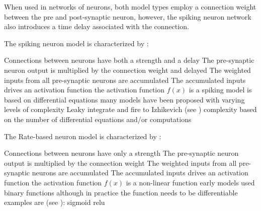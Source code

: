 When used in networks of neurons, both model types employ a connection weight between the pre and post-synaptic neuron, however, the spiking neuron network also introduces a time delay associated with the connection.

The spiking neuron model is characterized by \cite{paugam2012computing}:

\begin{outline}
        \1 Connections between neurons have both a strength and a delay
          \2 The pre-synaptic neuron output is multiplied by the connection weight and delayed 
        \1 The weighted inputs from all pre-synaptic neurons are accumulated
        \1 The accumulated inputs drives an activation function
          \2 the activation function $f(x)$ is a spiking model is based on differential equations
          \2 many models have been proposed with varying levels of complexity
              \3 Leaky integrate and fire \cite{Brunel2007} to Izhikevich \cite{Iz2005} (see )
              \3 complexity based on the number of differential equations and/or computations
         
\end{outline}

The Rate-based neuron model is characterized by \cite{NNintro_Bullinaria}:
\begin{outline}
        \1 Connections between neurons have only a strength
          \2 The pre-synaptic neuron output is multiplied by the connection weight
        \1 The weighted inputs from all pre-synaptic neurons are accumulated
        \1 The accumulated inputs drives an activation function
          \2 the activation function $f(x)$ is a non-linear function
          \2 early models used binary functions although in practice the function needs to be differentiable
            \3 examples are (see ):
              \4 sigmoid \cite{paugam2012computing}
              \4 \ac{relu} \cite{maas2013rectifier}
\end{outline}

